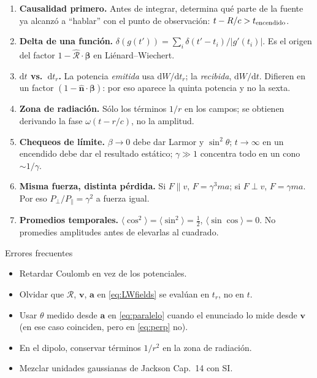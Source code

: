 \documentclass[11pt,a4paper]{article}
\newcommand{\Rs}{\mathcal R}
\newcommand{\Rh}{\hat{\bm{\mathcal R}}}
\newcommand{\nh}{\hat{\mathbf n}}
\newcommand{\bv}{\mathbf v}
\newcommand{\av}{\mathbf a}
\newcommand{\dd}{\mathrm d}
\newcommand{\bbeta}{\bm\beta}
\theoremstyle{remark}
\begin{document}
\begin{enumerate}[itemsep=0.4em]
\item \textbf{Causalidad primero.} Antes de integrar, determina qué parte de la fuente ya alcanzó a
``hablar'' con el punto de observación: $t-R/c>t_{\rm encendido}$.
\item \textbf{Delta de una función.} $\delta(g(t'))=\sum_i\delta(t'-t_i)/|g'(t_i)|$. Es el origen del
factor $1-\Rh\cdot\bbeta$ en Liénard--Wiechert.
\item \textbf{$\dd t$ vs.\ $\dd t_r$.} La potencia \emph{emitida} usa $\dd W/\dd t_r$; la \emph{recibida},
$\dd W/\dd t$. Difieren en un factor $(1-\nh\cdot\bbeta)$: por eso aparece la quinta potencia y no la sexta.
\item \textbf{Zona de radiación.} Sólo los términos $1/r$ en los campos; se obtienen derivando la fase
$\omega(t-r/c)$, no la amplitud.
\item \textbf{Chequeos de límite.} $\beta\to0$ debe dar Larmor y $\sin^2\theta$; $t\to\infty$ en un
encendido debe dar el resultado estático; $\gamma\gg1$ concentra todo en un cono $\sim1/\gamma$.
\item \textbf{Misma fuerza, distinta pérdida.} Si $F\parallel v$, $F=\gamma^3ma$; si $F\perp v$,
$F=\gamma ma$. Por eso $P_\perp/P_\parallel=\gamma^2$ a fuerza igual.
\item \textbf{Promedios temporales.} $\langle\cos^2\rangle=\langle\sin^2\rangle=\tfrac12$,
$\langle\sin\cos\rangle=0$. No promedies amplitudes antes de elevarlas al cuadrado.
\end{enumerate}

\begin{warnbox}{Errores frecuentes}
\begin{itemize}[itemsep=0.2em,leftmargin=1.2em]
\item Retardar Coulomb en vez de los potenciales.
\item Olvidar que $\Rs$, $\bv$, $\av$ en \eqref{eq:LWfields} se evalúan en $t_r$, no en $t$.
\item Usar $\theta$ medido desde $\av$ en \eqref{eq:paralelo} cuando el enunciado lo mide desde $\bv$
(en ese caso coinciden, pero en \eqref{eq:perp} no).
\item En el dipolo, conservar términos $1/r^2$ en la zona de radiación.
\item Mezclar unidades gaussianas de Jackson Cap.~14 con SI.
\end{itemize}
\end{warnbox}
\end{document}
